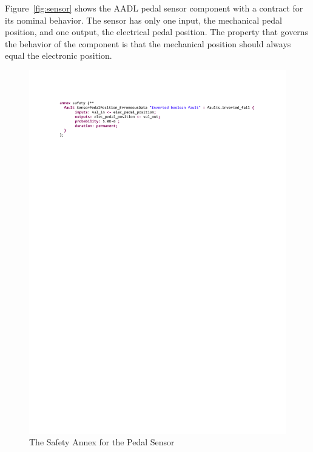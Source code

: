 Figure~\ref{fig:sensor} shows the AADL pedal sensor component with a contract for its nominal behavior. The sensor has only one input, the mechanical pedal position, and one output, the electrical pedal position. The property that governs the behavior of the component is that the mechanical position should always equal the electronic position. 

\begin{figure}[h!]
	\hspace*{-2cm}
	\begin{center}
		\includegraphics[trim=0 690 -10 70,clip,width=1.5\dimexpr\textwidth-2cm\relax]{images/safetyannex_sensorfault.pdf}
		\caption{The Safety Annex for the Pedal Sensor}
		\label{fig:sensorFault}
	\end{center}
	\vspace{-0.3in}
\end{figure}

